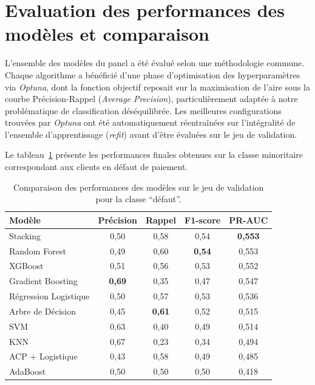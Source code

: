 \documentclass{article}
\begin{document}
\section{Evaluation des performances des modèles et comparaison}

L'ensemble des modèles du panel a été évalué selon une méthodologie commune. Chaque algorithme a bénéficié d'une phase d'optimisation des hyperparamètres via \textit{Optuna}, dont la fonction objectif reposait sur la maximisation de l'aire sous la courbe Précision-Rappel (\textit{Average Precision}), particulièrement adaptée à notre problématique de classification déséquilibrée. Les meilleures configurations trouvées par \textit{Optuna} ont été automatiquement réentraînées sur l'intégralité de l'ensemble d'apprentissage (\textit{refit}) avant d'être évaluées sur le jeu de validation.

Le tableau~\ref{tab:comparaison} présente les performances finales obtenues sur la classe minoritaire correspondant aux clients en défaut de paiement.

\begin{table}[h]
\centering
\caption{Comparaison des performances des modèles sur le jeu de validation pour la classe ``défaut''.}
\label{tab:comparaison}
\begin{tabular}{lcccc}
\hline
\textbf{Modèle} & \textbf{Précision} & \textbf{Rappel} & \textbf{F1-score} & \textbf{PR-AUC} \\
\hline
Stacking               & 0,50 & 0,58 & 0,54          & \textbf{0,553} \\
Random Forest          & 0,49 & 0,60 & \textbf{0,54} & 0,553          \\
XGBoost                & 0,51 & 0,56 & 0,53          & 0,552          \\
Gradient Boosting      & \textbf{0,69} & 0,35 & 0,47          & 0,547          \\
Régression Logistique  & 0,50 & 0,57 & 0,53          & 0,536          \\
Arbre de Décision      & 0,45 & \textbf{0,61} & 0,52          & 0,515          \\
SVM                    & 0,63 & 0,40 & 0,49          & 0,514          \\
KNN                    & 0,67 & 0,23 & 0,34          & 0,494          \\
ACP + Logistique       & 0,43 & 0,58 & 0,49          & 0,485          \\
AdaBoost               & 0,50 & 0,50 & 0,50          & 0,418          \\
\hline
\end{tabular}
\end{table}
\end{document}
